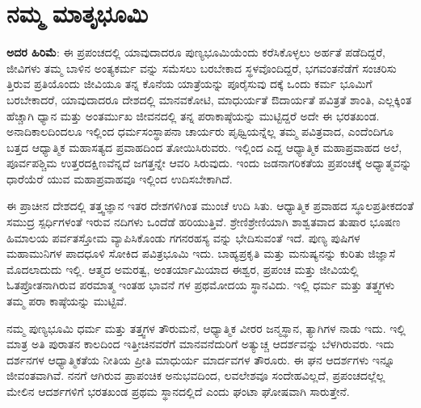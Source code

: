 
\chapter{ನಮ್ಮ ಮಾತೃಭೂಮಿ}

\textbf{ಅದರ ಹಿರಿಮೆ}: ಈ ಪ್ರಪಂಚದಲ್ಲಿ ಯಾವುದಾದರೂ ಪುಣ್ಯಭೂಮಿಯೆಂದು ಕರೆಸಿಕೊಳ್ಳಲು ಅರ್ಹತೆ ಪಡೆದಿದ್ದರೆ, ಜೀವಿಗಳು ತಮ್ಮ ಬಾಳಿನ ಅಂತ್ಯಕರ್ಮ ವನ್ನು ಸಮೆಸಲು ಬರಬೇಕಾದ ಸ್ಥಳವೊಂದಿದ್ದರೆ, ಭಗವಂತನೆಡೆಗೆ ಸಂಚರಿಸು ತ್ತಿರುವ ಪ್ರತಿಯೊಂದು ಜೀವಿಯೂ ತನ್ನ ಕೊನೆಯ ಯಾತ್ರೆಯನ್ನು ಪೂರೈಸುವು ದಕ್ಕೆ ಒಂದು ಕರ್ಮ ಭೂಮಿಗೆ ಬರಬೇಕಾದರೆ, ಯಾವುದಾದರೂ ದೇಶದಲ್ಲಿ ಮಾನವಕೋಟಿ, ಮಾಧುರ್ಯತೆ ಔದಾರ್ಯತೆ ಪವಿತ್ರತೆ ಶಾಂತಿ, ಎಲ್ಲಕ್ಕಿಂತ ಹೆಚ್ಚಾಗಿ ಧ್ಯಾನ ಮತ್ತು ಅಂತರ್ಮುಖ ಜೀವನದಲ್ಲಿ ತನ್ನ ಪರಾಕಾಷ್ಠೆಯನ್ನು ಮುಟ್ಟಿದ್ದರೆ ಅದೇ ಈ ಭರತಖಂಡ. ಅನಾದಿಕಾಲದಿಂದಲೂ ಇಲ್ಲಿಂದ ಧರ್ಮಸಂಸ್ಥಾಪನಾ ಚಾರ್ಯರು ಪೃಥ್ವಿಯನ್ನೆಲ್ಲ ತಮ್ಮ ಪವಿತ್ರವಾದ, ಎಂದೆಂದಿಗೂ ಬತ್ತದ ಆಧ್ಯಾತ್ಮಿಕ ಮಹಾಸತ್ಯದ ಪ್ರವಾಹದಿಂದ ತೋಯಿಸಿರುವರು. ಇಲ್ಲಿಂದ ಎದ್ದ ಆಧ್ಯಾತ್ಮಿಕ ಮಹಾಪ್ರವಾಹದ ಅಲೆ, ಪೂರ್ವಪಶ್ಚಿಮ ಉತ್ತರದಕ್ಷಿಣವೆನ್ನದೆ ಜಗತ್ತನ್ನೇ ಆವರಿ ಸಿರುವುದು. ಇಂದು ಜಡನಾಗರಿಕತೆಯ ಪ್ರಪಂಚಕ್ಕೆ ಅಧ್ಯಾತ್ಮವನ್ನು ಧಾರೆಯೆರೆ ಯುವ ಮಹಾಪ್ರವಾಹವೂ ಇಲ್ಲಿಂದ ಉದಿಸಬೇಕಾಗಿದೆ.

ಈ ಪ್ರಾಚೀನ ದೇಶದಲ್ಲಿ ತತ್ತ್ವಜ್ಞಾನ ಇತರ ದೇಶಗಳಿಗಿಂತ ಮುಂಚೆ ಉದಿ ಸಿತು. ಆಧ್ಯಾತ್ಮಿಕ ಪ್ರವಾಹದ ಸ್ಥೂಲಪ್ರತೀಕದಂತೆ ಸಮುದ್ರ ಸ್ಪರ್ಧಿಗಳಂತೆ ಇರುವ ನದಿಗಳು ಒಂದೆಡೆ ಹರಿಯುತ್ತಿವೆ. ಶ್ರೇಣಿಶ್ರೇಣಿಯಾಗಿ ಶಾಶ್ವತವಾದ ತುಷಾರ ಭೂಷಣ ಹಿಮಾಲಯ ಪರ್ವತಸ್ತೋಮ ವ್ಯಾಪಿಸಿಕೊಂಡು ಗಗನರಹಸ್ಯ ವನ್ನು ಭೇದಿಸುವಂತೆ ಇದೆ. ಪುಣ್ಯ ಪುಷಿಗಳ ಮಹಾಮುನಿಗಳ ಪಾದಧೂಳಿ ಸೋಕಿದ ಪವಿತ್ರಭೂಮಿ ಇದು. ಬಾಹ್ಯಪ್ರಕೃತಿ ಮತ್ತು ಮನುಷ್ಯನನ್ನು ಕುರಿತು ಜಿಜ್ಞಾಸೆ ಮೊದಲಾದುದು ಇಲ್ಲಿ. ಆತ್ಮದ ಅಮರತ್ವ, ಅಂತರ್ಯಾಮಿಯಾದ ಈಶ್ವರ, ಪ್ರಪಂಚ ಮತ್ತು ಜೀವಿಯಲ್ಲಿ ಓತಪ್ರೋತನಾಗಿರುವ ಪರಮಾತ್ಮ ಇಂತಹ ಭಾವನೆ ಗಳ ಪ್ರಥಮೋದಯ ಸ್ಥಾನವಿದು. ಇಲ್ಲಿ ಧರ್ಮ ಮತ್ತು ತತ್ತ್ವಗಳು ತಮ್ಮ ಪರಾ ಕಾಷ್ಠೆಯನ್ನು ಮುಟ್ಟಿವೆ.

ನಮ್ಮ ಪುಣ್ಯಭೂಮಿ ಧರ್ಮ ಮತ್ತು ತತ್ತ್ವಗಳ ತೌರುಮನೆ, ಆಧ್ಯಾತ್ಮಿಕ ವೀರರ ಜನ್ಮಸ್ಥಾನ, ತ್ಯಾಗಿಗಳ ನಾಡು ಇದು. ಇಲ್ಲಿ ಮಾತ್ರ ಅತಿ ಪುರಾತನ ಕಾಲದಿಂದ ಇತ್ತೀಚಿನವರೆಗೆ ಮಾನವನೆದುರಿಗೆ ಅತ್ಯುಚ್ಚ ಆದರ್ಶವನ್ನು ಬೆಳಗಿರುವರು. ಇದು ದರ್ಶನಗಳ ಆಧ್ಯಾತ್ಮಿಕತೆಯ ನೀತಿಯ ಪ್ರೀತಿ ಮಾಧುರ್ಯ ಮಾರ್ದವಗಳ ತೌರೂರು. ಈ ಘನ ಆದರ್ಶಗಳು ಇನ್ನೂ ಜೀವಂತವಾಗಿವೆ. ನನಗೆ ಆಗಿರುವ ಪ್ರಾಪಂಚಿಕ ಅನುಭವದಿಂದ, ಲವಲೇಶವೂ ಸಂದೇಹವಿಲ್ಲದೆ, ಪ್ರಪಂಚದಲ್ಲೆಲ್ಲ ಮೇಲಿನ ಆದರ್ಶಗಳಿಗೆ ಭರತಖಂಡ ಪ್ರಥಮ ಸ್ಥಾನದಲ್ಲಿದೆ ಎಂದು ಘಂಟಾ ಘೋಷವಾಗಿ ಸಾರುತ್ತೇನೆ.

